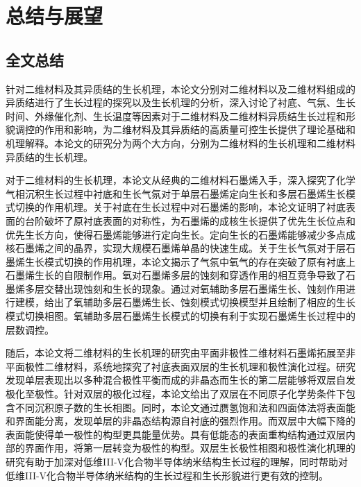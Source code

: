 
\chapter{总结与展望}
\section{全文总结}
针对二维材料及其异质结的生长机理，本论文分别对二维材料以及二维材料组成的异质结进行了生长过程的探究以及生长机理的分析，深入讨论了衬底、气氛、生长时间、外缘催化剂、生长温度等因素对于二维材料及二维材料异质结生长过程和形貌调控的作用和影响，为二维材料及其异质结的高质量可控生长提供了理论基础和机理解释。本论文的研究分为两个大方向，分别为二维材料的生长机理和二维材料异质结的生长机理。

对于二维材料的生长机理，本论文从经典的二维材料石墨烯入手，深入探究了化学气相沉积生长过程中衬底和生长气氛对于单层石墨烯定向生长和多层石墨烯生长模式切换的作用机理。关于衬底在生长过程中对石墨烯的影响，本论文证明了衬底表面的台阶破坏了原衬底表面的对称性，为石墨烯的成核生长提供了优先生长位点和优先生长方向，使得石墨烯能够进行定向生长。定向生长的石墨烯能够减少多点成核石墨烯之间的晶界，实现大规模石墨烯单晶的快速生成。关于生长气氛对于层石墨烯生长模式切换的作用机理，本论文揭示了气氛中氧气的存在突破了原有衬底上石墨烯生长的自限制作用。氧对石墨烯多层的蚀刻和穿透作用的相互竞争导致了石墨烯多层交替出现蚀刻和生长的现象。通过对氧辅助多层石墨烯生长、蚀刻作用进行建模，给出了氧辅助多层石墨烯生长、蚀刻模式切换模型并且绘制了相应的生长模式切换相图。氧辅助多层石墨烯生长模式的切换有利于实现石墨烯生长过程中的层数调控。

随后，本论文将二维材料的生长机理的研究由平面非极性二维材料石墨烯拓展至非平面极性二维材料，系统地探究了衬底表面双层的生长机理和极性演化过程。研究发现单层表现出以多种混合极性平衡而成的非晶态而生长的第二层能够将双层自发极化至极性。针对双层的极化过程，本论文给出了双层在不同原子化学势条件下包含不同沉积原子数的生长相图。同时，本论文通过赝氢饱和法和四面体法将表面能和界面能分离，发现单层的非晶态结构源自衬底的强烈作用。而双层中大幅下降的表面能使得单一极性的构型更具能量优势。具有低能态的表面重构结构通过双层内部的界面作用，将第一层转变为极性的构型。双层生长极性相图和极性演化机理的研究有助于加深对低维III-V化合物半导体纳米结构生长过程的理解，同时帮助对低维III-V化合物半导体纳米结构的生长过程和生长形貌进行更有效的控制。

